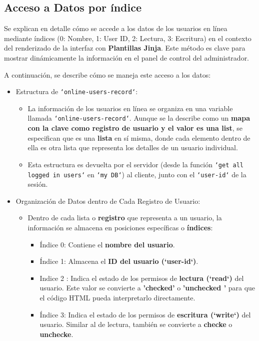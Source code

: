 \documentclass{report}
\begin{document}
\subsection{Acceso a Datos por índice}
Se explican en detalle cómo se accede a los datos de los usuarios en línea mediante índices (0: Nombre, 1: User ID, 2: Lectura, 3: Escritura) 
en el contexto del renderizado de la interfaz con \textbf{Plantillas Jinja}. Este método es clave para mostrar dinámicamente la información en el panel 
de control del administrador.

A continuación, se describe cómo se maneja este acceso a los datos:
\begin{itemize}
    \item Estructura de \texttt{`online-users-record`}:
    \begin{itemize}
        \item La información de los usuarios en línea se organiza en una variable llamada \texttt{`online-users-record`}. Aunque se la describe como 
        un \textbf{mapa con la clave como registro de usuario y el valor es una list}, se  especifican que es una \textbf{lista} en sí misma, 
        donde cada elemento dentro de ella es otra lista que representa los detalles de un usuario individual.
        \item Esta estructura es devuelta por el servidor (desde la función \texttt{`get all logged in users`} en \texttt{`my DB`}) al cliente, 
        junto con el \texttt{`user-id`} de la sesión.
    \end{itemize}

    \item Organización de Datos dentro de Cada Registro de Usuario:
    \begin{itemize}
        \item Dentro de cada lista o \textbf{registro} que representa a un usuario, la información se almacena en posiciones específicas o \textbf{índices}:
            \begin{itemize}
                \item Índice 0: Contiene el \textbf{nombre del usuario}.
                \item Índice 1: Almacena el \textbf{ID del usuario (`user-id`)}.
                \item Indice 2 : Indica el estado de los permisos de \textbf{lectura (`read`)} del usuario. Este valor se convierte a \textbf{'checked'} o 
                \textbf{ 'unchecked '} para que el código HTML pueda interpretarlo directamente.
                \item Índice 3: Indica el estado de los permisos de \textbf{escritura (`write`)} del usuario. Similar al de lectura, también se convierte
                a \textbf{checke} o \textbf{unchecke}.        
        \end{itemize}    
    \end{itemize}


\end{itemize}
\end{document}
